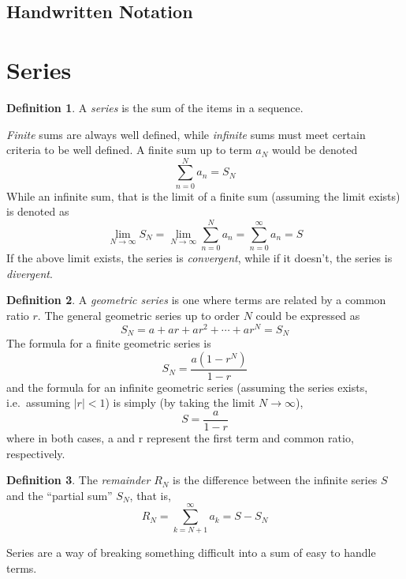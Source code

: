 \documentclass[a4paper]{article}
\numberwithin{equation}{subsection}
\theoremstyle{definition}
\newtheorem{definition}{Definition}[section]
\theoremstyle{remark}
\newenvironment{definitionSR}
{
\begin{siderules}
\begin{definition}
}
{
\end{definition}
\end{siderules}
}
\begin{document}
\subsection{Handwritten Notation}

\section{Series}
\begin{definitionSR}
A \textit{series} is the sum of the items in a sequence.
\end{definitionSR}


\emph{Finite} sums are always well defined, while \emph{infinite} sums must meet certain criteria to be well defined. A finite sum up to term $a_N$ would be denoted
\[
	\sum_{n=0}^N a_n = S_N
\]
While an infinite sum, that is the limit of a finite sum (assuming the limit exists) is denoted as
\[
	\lim_{N \to \infty} S_N = \lim_{N \to \infty} \sum_{n=0}^N a_n = \sum_{n=0}^\infty a_n = S
\]
If the above limit exists, the series is \textit{convergent}, while if it doesn't, the series is \textit{divergent}.

\begin{definitionSR}
A \textit{geometric series} is one where terms are related by a common ratio $r$. The general geometric series up to order $N$ could be expressed as
  \[
      S_N = a + ar + ar^2 + \cdots + ar^N = S_N
  \]
The formula for a finite geometric series is
  \begin{equation}
  S_N = \frac{a(1-r^N)}{1-r}
  \end{equation}
and the formula for an infinite geometric series (assuming the series exists, i.e.\ assuming $|r|<1$) is simply (by taking the limit $N \to \infty$),
  \begin{equation}
  S = \frac{a}{1-r}
  \end{equation}
where in both cases, a and r represent the first term and common ratio, respectively.\\
\end{definitionSR}


\begin{definitionSR}
The \textit{remainder} $R_N$ is the difference between the infinite series $S$ and the ``partial sum'' $S_N$, that is,
\[
	R_N = \sum_{k=N+1}^\infty a_k = S-S_N
\]
\end{definitionSR}

Series are a way of breaking something difficult into a sum of easy to handle terms.
\end{document}

